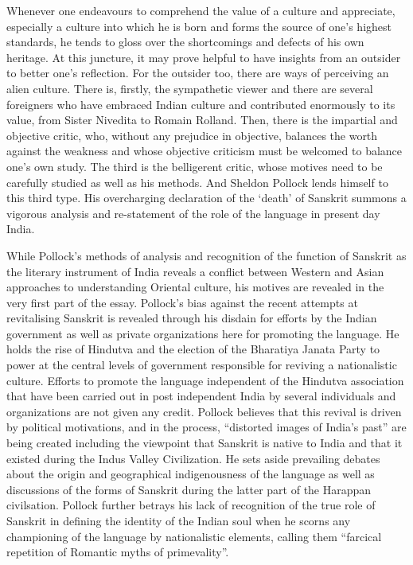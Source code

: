 Whenever one endeavours to comprehend the value of a culture and appreciate, especially a culture into which he is born and forms the source of one’s highest standards, he tends to gloss over the shortcomings and defects of his own heritage. At this juncture, it may prove helpful to have insights from an outsider to better one’s reflection. For the outsider too, there are ways of perceiving an alien culture. There is, firstly, the sympathetic viewer and there are several foreigners who have embraced Indian culture and contributed enormously to its value, from Sister Nivedita to Romain Rolland. Then, there is the impartial and objective critic, who, without any prejudice in objective, balances the worth against the weakness and whose objective criticism must be welcomed to balance one’s own study. The third is the belligerent critic, whose motives need to be carefully studied as well as his methods. And Sheldon Pollock lends himself to this third type. His overcharging declaration of the ‘death’ of Sanskrit summons a vigorous analysis and re-statement of the role of the language in present day India.

While Pollock’s methods of analysis and recognition of the function of Sanskrit as the literary instrument of India reveals a conflict between Western and Asian approaches to understanding Oriental culture, his motives are revealed in the very first part of the essay. Pollock’s bias against the recent attempts at revitalising Sanskrit is revealed through his disdain for efforts by the Indian government as well as private organizations here for promoting the language. He holds the rise of Hindutva and the election of the Bharatiya Janata Party to power at the central levels of government responsible for reviving a nationalistic culture. Efforts to promote the language independent of the Hindutva association that have been carried out in post independent India by several individuals and organizations are not given any credit. Pollock believes that this revival is driven by political motivations, and in the process, “distorted images of India’s past” are being created including the viewpoint that Sanskrit is native to India and that it existed during the Indus Valley Civilization. He sets aside prevailing debates about the origin and geographical indigenousness of the language as well as discussions of the forms of Sanskrit during the latter part of the Harappan civilsation. Pollock further betrays his lack of recognition of the true role of Sanskrit in defining the identity of the Indian soul when he scorns any championing of the language by nationalistic elements, calling them “farcical repetition of Romantic myths of primevality”. 

